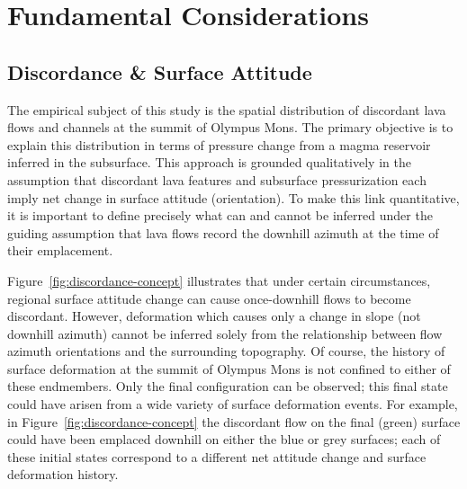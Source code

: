 \section{Fundamental Considerations}\label{sec:considerations}

\subsection{Discordance \& Surface Attitude}\label{sec:downhill-flows}

The empirical subject of this study is the spatial distribution of discordant lava flows and channels at the summit of Olympus Mons. The primary objective is to explain this distribution in terms of pressure change from a magma reservoir inferred in the subsurface. This approach is grounded qualitatively in the assumption that discordant lava features and subsurface pressurization each imply net change in surface attitude (orientation). To make this link quantitative, it is important to define precisely what can and cannot be inferred under the guiding assumption that lava flows record the downhill azimuth at the time of their emplacement.

Figure~\ref{fig:discordance-concept} illustrates that under certain circumstances, regional surface attitude change can cause once-downhill flows to become discordant. However, deformation which causes only a change in slope (not downhill azimuth) cannot be inferred solely from the relationship between flow azimuth orientations and the surrounding topography. Of course, the history of surface deformation at the summit of Olympus Mons is not confined to either of these endmembers. Only the final configuration can be observed; this final state could have arisen from a wide variety of surface deformation events. For example, in Figure~\ref{fig:discordance-concept} the discordant flow on the final (green) surface could have been emplaced downhill on either the blue or grey surfaces; each of these initial states correspond to a different net attitude change and surface deformation history.


